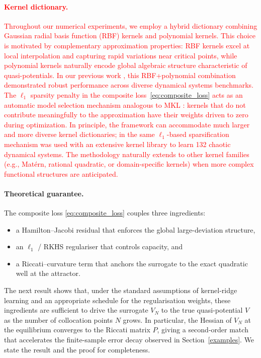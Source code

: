 \documentclass[11pt]{article}
\theoremstyle{plain}      %
\theoremstyle{definition} %
\begin{document}
\textcolor{red}{
\paragraph{Kernel dictionary.}
Throughout our numerical experiments, we employ a hybrid dictionary combining Gaussian radial basis function (RBF) kernels and polynomial kernels. This choice is motivated by complementary approximation properties: RBF kernels excel at local interpolation and capturing rapid variations near critical points, while polynomial kernels naturally encode global algebraic structure characteristic of quasi-potentials. In our previous work \cite{hamzi2021learning}, this RBF+polynomial combination demonstrated robust performance across diverse dynamical systems benchmarks. The $\ell_1$ sparsity penalty in the composite loss~\eqref{eq:composite_loss} acts as an automatic model selection mechanism analogous to MKL \cite{lanckriet2004learning, bach2004multiple}: kernels that do not contribute meaningfully to the approximation have their weights driven to zero during optimization. In principle, the framework can accommodate much larger and more diverse kernel dictionaries; in \cite{bh_sparse_kfs} the same $\ell_1$-based sparsification mechanism was used with an extensive kernel library to learn 132 chaotic dynamical systems. The methodology naturally extends to other kernel families (e.g., Mat\'ern, rational quadratic, or domain-specific kernels) when more complex functional structures are anticipated.
}

\paragraph{Theoretical guarantee.}
The composite loss \eqref{eq:composite_loss} couples three ingredients:\begin{itemize}
    \item[i.] a Hamilton--Jacobi residual that enforces the global large-deviation
structure, \item[ii.]  an $\ell_{1}$ / RKHS regulariser that controls capacity,
and \item[iii.]  a Riccati–curvature term that anchors the surrogate to the exact
quadratic well at the attractor.
\end{itemize}
  The next result shows that, under the
standard assumptions of kernel‐ridge learning and an appropriate schedule
for the regularisation weights, these ingredients are sufficient to drive
the surrogate \(V_{N}\) to the true quasi-potential \(V\) as the number of
collocation points \(N\) grows.  In particular, the Hessian of \(V_{N}\)
at the equilibrium converges to the Riccati matrix \(P\), giving a
second-order match that accelerates the finite-sample error decay observed
in Section~\ref{examples}.  We state the result and the proof for completeness.
\end{document}
